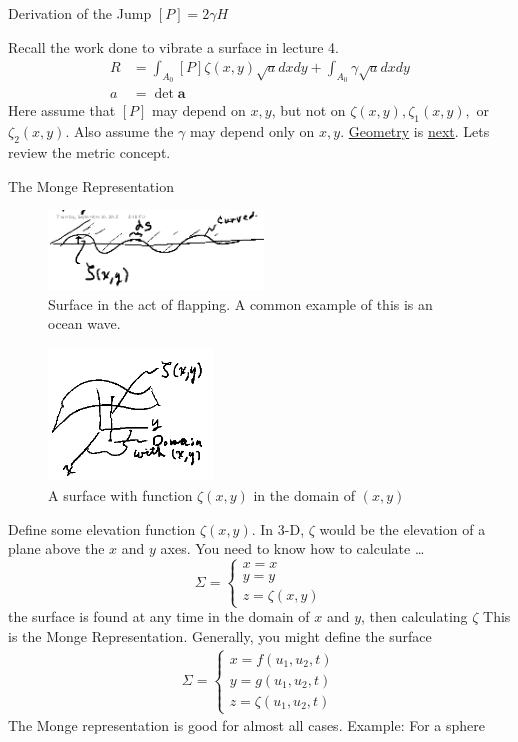 \documentclass{article}
\newcommand{\matr}[1]{\bm{#1}}
\begin{document}
\begin{section}{Derivation of the Jump $[P] = 2\gamma H$}
	\begin{subsection}
  Recall the work done to vibrate a surface in lecture 4. 
  \begin{align*}
    R  &= \int_{A_0} [P]\zeta(x,y) \sqrt{a}dx dy + \int_{A_0} \gamma\sqrt{a} dx dy\\
    a &= \det{\matr{a}}
  \end{align*}
	Here assume that $[P]$ may depend on $x,y$, but not on $\zeta(x,y), \zeta_1(x,y),$ or $\zeta_2(x,y)$. Also assume the $\gamma$ may depend only on $x,y$. \underline{Geometry} is \underline{next}.
Lets review the metric concept. 
\end{subsection}
\begin{subsection}{The Monge Representation}

	\begin{figure}[h]
		\centering
		\includegraphics[height=60pt]{vibratingBar}
		\caption{Surface in the act of flapping. A common example of this is an ocean wave.}
		\label{fig:vibrating bar}
	\end{figure}
	\begin{figure}[h]
		\centering
		\includegraphics[height=100pt]{zetaSurface}
		\caption{A surface with function $\zeta(x,y)$ in the domain of $(x,y)$}
		\label{fig:zetaSurface}
	\end{figure}
  Define some elevation function $\zeta(x,y)$. In 3-D, $\zeta$ would be the elevation of a plane above the $x$ and $y$ axes. You need to know how to calculate \dots
$$\Sigma =   \begin{cases} x = x\\
  y = y\\
  z = \zeta(x,y)
  \end{cases}$$
  the surface is found at any time in the domain of $x$ and $y$, then calculating $\zeta$
  This is the Monge Representation. Generally, you might define the surface 
  \begin{align*}
    \Sigma  = \begin{cases} x = f(u_1,u_2,t)\\
      y = g(u_1,u_2,t)\\
    z = \zeta(u_1,u_2,t)\end{cases}
  \end{align*}
  The Monge representation is good for almost all cases.
  Example: For a sphere


\end{subsection}
\end{section}
\end{document}
